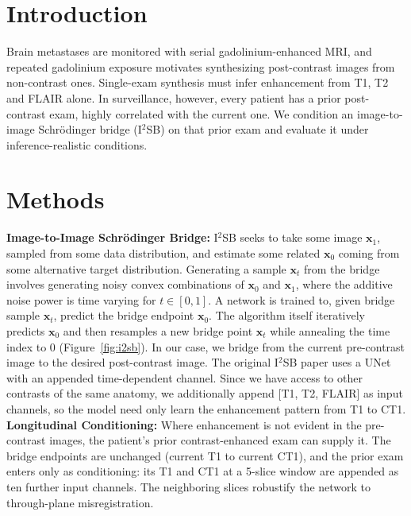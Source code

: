 \section*{Introduction}
Brain metastases are monitored with serial gadolinium-enhanced MRI, and repeated gadolinium
exposure motivates synthesizing post-contrast images from non-contrast ones. Single-exam
synthesis must infer enhancement from T1, T2 and FLAIR alone. In surveillance, however, every
patient has a prior post-contrast exam, highly correlated with the current one. We condition an
image-to-image Schr\"odinger bridge (I$^2$SB) on that prior exam and evaluate it under
inference-realistic conditions.

\section*{Methods}
\textbf{Image-to-Image Schr\"odinger Bridge:} I$^2$SB seeks to take some image $\bm{x}_1$,
sampled from some data distribution, and estimate some related $\bm{x}_0$ coming from some
alternative target distribution. Generating a sample $\bm{x}_t$ from the bridge involves
generating noisy convex combinations of $\bm{x}_0$ and $\bm{x}_1$, where the additive noise
power is time varying for $t \in [0, 1]$. A network is trained to, given bridge sample
$\bm{x}_t$, predict the bridge endpoint $\bm{x}_0$. The algorithm itself iteratively predicts
$\bm{x}_0$ and then resamples a new bridge point $\bm{x}_t$ while annealing the time index to $0$
(Figure~\ref{fig:i2sb}). In our case, we bridge from the current pre-contrast image to the
desired post-contrast image. The original I$^2$SB paper uses a UNet with an appended
time-dependent channel. Since we have access to other contrasts of the same anatomy, we
additionally append [T1, T2, FLAIR] as input channels, so the model need only learn the
enhancement pattern from T1 to CT1.\\

\textbf{Longitudinal Conditioning:} Where enhancement is not evident in the pre-contrast images,
the patient's prior contrast-enhanced exam can supply it. The bridge endpoints are unchanged
(current T1 to current CT1), and the prior exam enters only as conditioning: its T1 and CT1 at a
5-slice window are appended as ten further input channels. The neighboring slices robustify the
network to through-plane misregistration.\\

